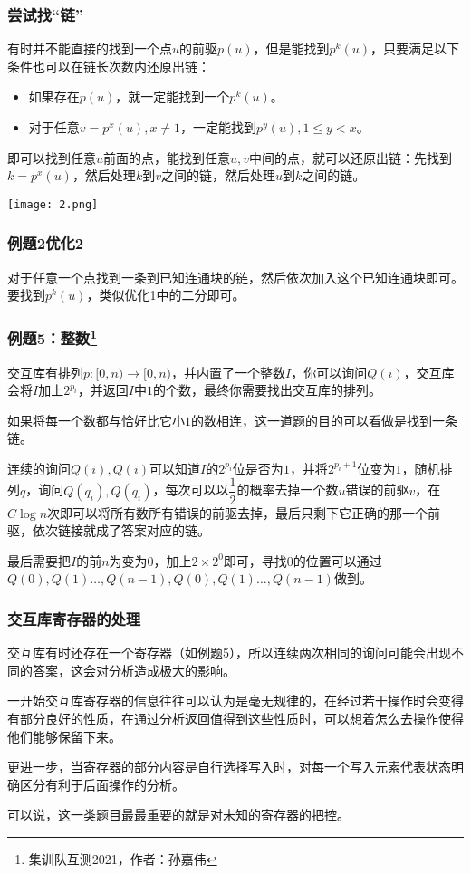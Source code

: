\documentclass[10pt]{beamer}
\begin{document}
	\begin{frame}
		\frametitle{尝试找“链”}
	
		有时并不能直接的找到一个点$u$的前驱$p(u)$，但是能找到$p^{k}(u)$，只要满足以下条件也可以在链长次数内还原出链：

		\begin{itemize}
			\item 如果存在$p(u)$，就一定能找到一个$p^k(u)$。
			\item 对于任意$v=p^x(u),x\not=1$，一定能找到$p^y(u),1\le y<x$。
		\end{itemize}

		即可以找到任意$u$前面的点，能找到任意$u,v$中间的点，就可以还原出链：先找到$k=p^x(u)$，然后处理$k$到$v$之间的链，然后处理$u$到$k$之间的链。

		\texttt{[image: 2.png]}

	
	\end{frame}
	\begin{frame}
		\frametitle{例题2优化2}

对于任意一个点找到一条到已知连通块的链，然后依次加入这个已知连通块即可。要找到$p^k(u)$，类似优化1中的二分即可。
\end{frame}
	\begin{frame}
		\frametitle{例题5：整数\footnote{集训队互测2021，作者：孙嘉伟}}
	
		
	

		交互库有排列$p:[0,n)\rightarrow[0,n)$，并内置了一个整数$I$，你可以询问$Q(i)$，交互库会将$I$加上$2^{p_i}$，并返回$I$中$1$的个数，最终你需要找出交互库的排列。


		如果将每一个数都与恰好比它小$1$的数相连，这一道题的目的可以看做是找到一条链。

		连续的询问$Q(i),Q(i)$可以知道$I$的$2^{p_i}$位是否为$1$，并将$2^{p_i+1}$位变为$1$，随机排列$q$，询问$Q(q_i),Q(q_i)$，每次可以以$\dfrac 12$的概率去掉一个数$u$错误的前驱$v$，在$C\log n$次即可以将所有数所有错误的前驱去掉，最后只剩下它正确的那一个前驱，依次链接就成了答案对应的链。

		最后需要把$I$的前$n$为变为$0$，加上$2\times 2^0$即可，寻找$0$的位置可以通过$Q(0),Q(1)\dots,Q(n-1),Q(0),Q(1)\dots,Q(n-1)$做到。

	\end{frame}
	\begin{frame}
		\frametitle{交互库寄存器的处理}
	
		交互库有时还存在一个寄存器（如例题5），所以连续两次相同的询问可能会出现不同的答案，这会对分析造成极大的影响。

		一开始交互库寄存器的信息往往可以认为是毫无规律的，在经过若干操作时会变得有部分良好的性质，在通过分析返回值得到这些性质时，可以想着怎么去操作使得他们能够保留下来。

		更进一步，当寄存器的部分内容是自行选择写入时，对每一个写入元素代表状态明确区分有利于后面操作的分析。

		可以说，这一类题目最最重要的就是对未知的寄存器的把控。
	
	\end{frame}
\end{document}
